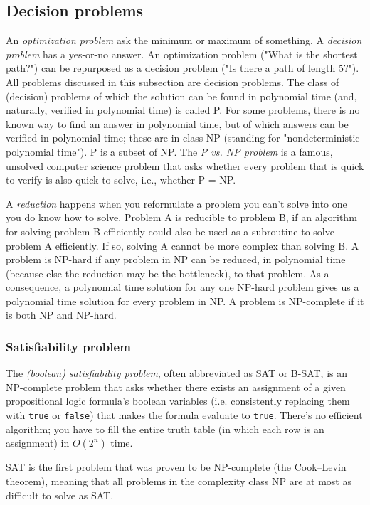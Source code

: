 \documentclass[8pt, table, xcdraw]{article}%
\begin{document}
\subsection{Decision problems}

An \emph{optimization problem} ask the minimum or maximum of something. A \emph{decision problem} has a yes-or-no answer. An optimization problem ("What is the shortest path?") can be repurposed as a decision problem ("Is there a path of length 5?"). All problems discussed in this subsection are decision problems. The class of (decision) problems of which the solution can be found in polynomial time (and, naturally, verified in polynomial time) is called P. For some problems, there is no known way to find an answer in polynomial time, but of which answers can be verified in polynomial time; these are in class NP (standing for "nondeterministic polynomial time"). P is a subset of NP. The \emph{P vs. NP problem} is a famous, unsolved computer science problem that asks whether every problem that is quick to verify is also quick to solve, i.e., whether P = NP.

A \emph{reduction} happens when you reformulate a problem you can't solve into one you do know how to solve. Problem A is reducible to problem B, if an algorithm for solving problem B efficiently could also be used as a subroutine to solve problem A efficiently. If so, solving A cannot be more complex than solving B. A problem is NP-hard if any problem in NP can be reduced, in polynomial time (because else the reduction may be the bottleneck), to that problem. As a consequence, a polynomial time solution for any one NP-hard problem gives us
a polynomial time solution for every problem in NP. A problem is NP-complete if it is both NP and NP-hard.

\subsubsection{Satisfiability problem}

The \emph{(boolean) satisfiability problem}, often abbreviated as SAT or B-SAT, is an NP-complete problem that asks whether there exists an assignment of a given propositional logic formula's boolean variables (i.e. consistently replacing them with \lstinline{true} or \lstinline{false}) that makes the formula evaluate to \lstinline{true}. There's no efficient algorithm; you have to fill the entire truth table (in which each row is an assignment) in $O(2^n)$ time.

SAT is the first problem that was proven to be NP-complete (the Cook–Levin theorem), meaning that all problems in the complexity class NP are at most as difficult to solve as SAT.
\end{document}
